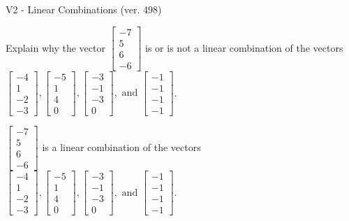 \begin{exercise}
  \begin{exerciseTitle}V2 - Linear Combinations (ver. 498)\end{exerciseTitle}
  \begin{exerciseStatement}
    Explain why the vector \(\left[\begin{array}{c}
-7 \\
5 \\
6 \\
-6
\end{array}\right]\)  is or is not a linear 
	combination of the vectors \(\left[\begin{array}{c}
-4 \\
1 \\
-2 \\
-3
\end{array}\right] , \left[\begin{array}{c}
-5 \\
1 \\
4 \\
0
\end{array}\right] , \left[\begin{array}{c}
-3 \\
-1 \\
-3 \\
0
\end{array}\right] , \text{ and } \left[\begin{array}{c}
-1 \\
-1 \\
-1 \\
-1
\end{array}\right]\).
	


  \end{exerciseStatement}
  \begin{exerciseAnswer}
   \(\left[\begin{array}{c}
-7 \\
5 \\
6 \\
-6
\end{array}\right]\) 
  	 is  
	a linear combination of the vectors \(\left[\begin{array}{c}
-4 \\
1 \\
-2 \\
-3
\end{array}\right] , \left[\begin{array}{c}
-5 \\
1 \\
4 \\
0
\end{array}\right] , \left[\begin{array}{c}
-3 \\
-1 \\
-3 \\
0
\end{array}\right] , \text{ and } \left[\begin{array}{c}
-1 \\
-1 \\
-1 \\
-1
\end{array}\right]\).


\end{exerciseAnswer}
\end{exercise}
